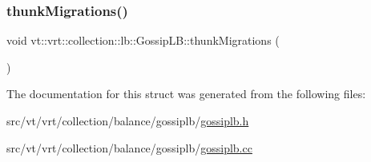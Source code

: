 \subsubsection{\texorpdfstring{thunk\+Migrations()}{thunkMigrations()}}
{\footnotesize\ttfamily void vt\+::vrt\+::collection\+::lb\+::\+Gossip\+L\+B\+::thunk\+Migrations (\begin{DoxyParamCaption}{ }\end{DoxyParamCaption})\hspace{0.3cm}{\ttfamily [protected]}}



The documentation for this struct was generated from the following files\+:\begin{DoxyCompactItemize}
\item 
src/vt/vrt/collection/balance/gossiplb/\hyperlink{gossiplb_8h}{gossiplb.\+h}\item 
src/vt/vrt/collection/balance/gossiplb/\hyperlink{gossiplb_8cc}{gossiplb.\+cc}\end{DoxyCompactItemize}
